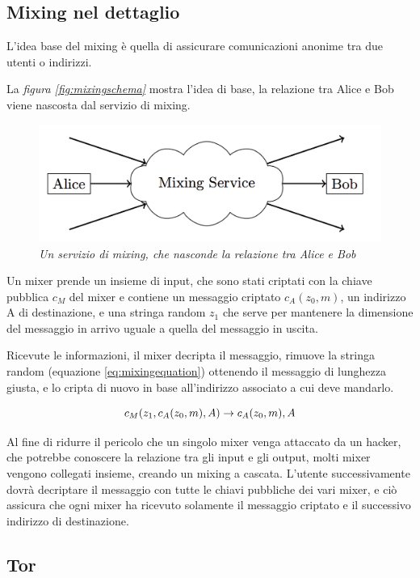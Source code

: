 \subsection{Mixing nel dettaglio}
L'idea base del mixing è quella di assicurare comunicazioni anonime tra due utenti o indirizzi.

 La \textit{figura \ref{fig:mixingschema}} mostra l'idea di base, la relazione tra Alice e Bob viene nascosta dal servizio di mixing.
\begin{figure}[htbp]
	\centering
	\includegraphics[width = 0.7 \linewidth]{figure/moesermixservice}
	\caption{\textit{Un servizio di mixing, che nasconde la relazione tra Alice e Bob}}\label{moesermixservice}
\end{figure}

Un mixer prende un insieme di input, che sono stati criptati con la chiave pubblica $c_M$ del mixer e contiene un messaggio criptato $c_A(z_0,m)$, un indirizzo A di destinazione, e una stringa random $z_1$ che serve per mantenere la dimensione del messaggio in arrivo uguale a quella del messaggio in uscita.

Ricevute le informazioni, il mixer decripta il messaggio, rimuove la stringa random (equazione \eqref{eq:mixingequation}) ottenendo il messaggio di lunghezza giusta, e lo cripta di nuovo in base all'indirizzo associato a cui deve mandarlo.

\begin{equation}
	\centering
	c_M(z_1,c_A(z_0,m),A) \to c_A(z_0,m),A
	\label{eq:mixingequation}
\end{equation}

Al fine di ridurre il pericolo che un singolo mixer venga attaccato da un hacker, che potrebbe conoscere la relazione tra gli input e gli output, molti mixer vengono collegati insieme, creando un mixing a cascata. L'utente successivamente dovrà decriptare il messaggio con tutte le chiavi pubbliche dei vari mixer, e ciò assicura che ogni mixer ha ricevuto solamente il messaggio criptato e il successivo indirizzo di destinazione.\cite{moser2013anonymity}

\subsection{Tor}

